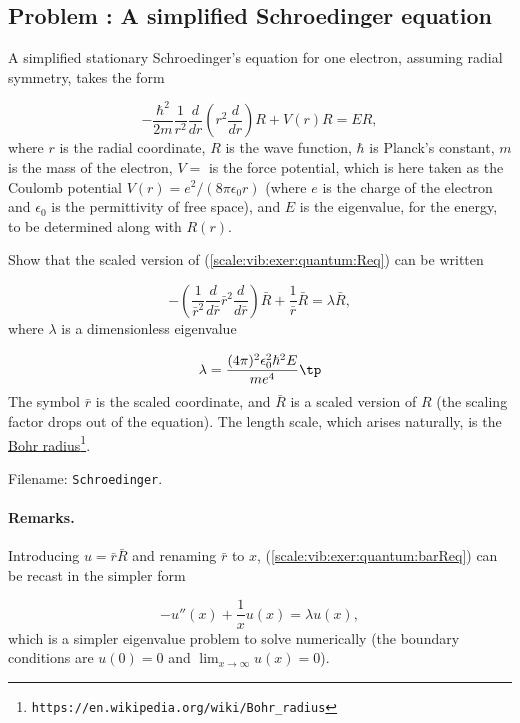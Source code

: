 \documentclass[graybox,envcountchap,sectrefs,final]{svmonodo}
\newcounter{doconce:movie:counter}
\newenvironment{doconceexercise}{}{}
\newcounter{doconceexercisecounter}
\begin{document}
\begin{doconceexercise}

\subsection*{Problem \thedoconceexercisecounter: A simplified Schroedinger equation}

\label{scale:vib:exer:quantum}

A simplified stationary
Schroedinger's equation for one electron, assuming radial symmetry, takes
the form

\begin{equation}
-\frac{\hbar^2}{2m}
\frac{1}{r^2}\frac{d}{dr}\left(r^2\frac{d}{dr}\right) R
+ V(r)R = ER,
\label{scale:vib:exer:quantum:Req}
\end{equation}
where $r$ is the radial coordinate, $R$ is the wave function,
$\hbar$ is Planck's constant, $m$ is the mass of the electron,
$V=$ is the force potential, which is here taken as the
Coulomb potential $V(r) = {e^2}/(8\pi\epsilon_0 r)$
(where $e$ is the charge of the electron and $\epsilon_0$ is the
permittivity of free space), and $E$ is
the eigenvalue, for the energy, to be determined along with $R(r)$.

Show that the scaled version of (\ref{scale:vib:exer:quantum:Req}) can be written

\begin{equation}
- \left(\frac{1}{\bar r^2}\frac{d}{d\bar r}\bar r^2
\frac{d}{d\bar r}\right)
\bar R + \frac{1}{\bar r}\bar R = \lambda\bar R,
\label{scale:vib:exer:quantum:barReq}
\end{equation}
where $\lambda$ is a dimensionless eigenvalue

\[ \lambda = \frac{(4\pi)^2\epsilon_0^2\hbar^2E}{me^4}\tp\]
The symbol $\bar r$ is the scaled coordinate, and $\bar R$ is a scaled
version of $R$ (the scaling factor drops out of the equation).
The length scale, which arises naturally, is the
\href{{https://en.wikipedia.org/wiki/Bohr_radius}}{Bohr radius}\footnote{\texttt{https://en.wikipedia.org/wiki/Bohr\_radius}}.


\noindent Filename: \texttt{Schroedinger}.


\paragraph{Remarks.}
Introducing $u=\bar r\bar R$ and renaming $\bar r$ to $x$,
(\ref{scale:vib:exer:quantum:barReq}) can be recast in the simpler form

\[ -u''(x) + \frac{1}{x}u(x) = \lambda u(x),\]
which is a simpler eigenvalue problem to solve numerically (the boundary
conditions are $u(0)=0$ and $\lim_{x\rightarrow\infty}u(x)=0$).


\end{doconceexercise}
\end{document}
